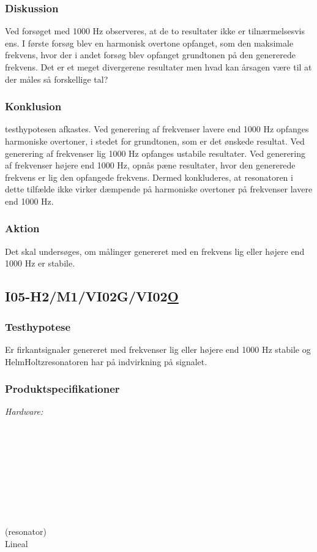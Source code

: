 			  
			\subsubsection{Diskussion}
			Ved forsøget med 1000 Hz observeres, at de to resultater ikke er tilnærmelsesvis ens. I første forsøg blev en harmonisk overtone opfanget, som den maksimale frekvens, hvor der i andet forsøg blev opfanget grundtonen på den genererede frekvens. Det er et meget divergerene resultater men hvad kan årsagen være til at der måles så forskellige tal?
			
			\subsubsection{Konklusion}
			testhypotesen afkastes. 
			Ved generering af frekvenser lavere end 1000 Hz opfanges harmoniske overtoner, i stedet for grundtonen, som er det ønskede resultat. 
			Ved generering af frekvenser lig 1000 Hz opfanges ustabile resultater. 
			Ved generering af frekvenser højere end 1000 Hz, opnås pæne resultater, hvor den genererede frekvens er lig den opfangede frekvens.  
			Dermed konkluderes, at resonatoren i dette tilfælde ikke virker dæmpende på harmoniske overtoner på frekvenser lavere end 1000 Hz. 
			  
			\subsubsection{Aktion}
			Det skal undersøges, om målinger genereret med en frekvens lig eller højere end 1000 Hz er stabile. 
			
			\subsection{I05-H2/M1/VI02G/VI02\underline{O}}
			
		\subsubsection{Testhypotese}
		Er firkantsignaler genereret med frekvenser lig eller højere end 1000 Hz stabile og HelmHoltzresonatoren har på indvirkning på signalet. 
		
		\subsubsection{Produktspecifikationer}
		
		\textit{Hardware:}\\
		\tores\\
		\hojtalerkabel\\
		\kabelsko\\
		\pins\\
		\krympeflex\\
		\arduino\\
		\mikrofon\\
		\PC\\
		\usbkabel\\
		 (resonator)\\
		Lineal\\
	

